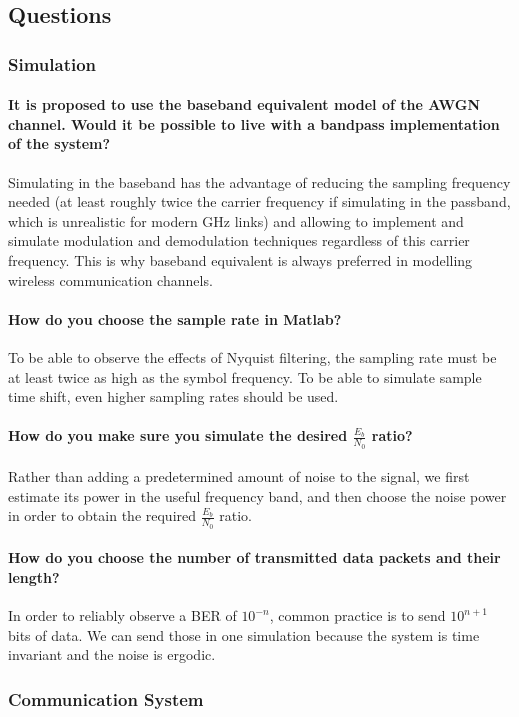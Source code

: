 \subsection{Questions}
\subsubsection{Simulation}
\paragraph{It is proposed to use the baseband equivalent model of the AWGN channel. Would it be
possible to live with a bandpass implementation of the system?}
Simulating in the baseband has the advantage of reducing the sampling frequency needed (at least roughly twice the carrier frequency if simulating in the passband, which is unrealistic for modern \si{\giga\hertz} links) and allowing to implement and simulate modulation and demodulation techniques regardless of this carrier frequency.
This is why baseband equivalent is always preferred in modelling wireless communication channels.
\paragraph{How do you choose the sample rate in Matlab?}
To be able to observe the effects of Nyquist filtering, the sampling rate must be at least twice as high as the symbol frequency. To be able to simulate sample time shift, even higher sampling rates should be used.
\paragraph{How do you make sure you simulate the desired $\frac{E_b}{N_0}$ ratio?}
Rather than adding a predetermined amount of noise to the signal, we first estimate its power in the useful frequency band, and then choose the noise power in order to obtain the required $\frac{E_b}{N_0}$ ratio.
\paragraph{How do you choose the number of transmitted data packets and their length?}
In order to reliably observe a BER of $10^{-n}$, common practice is to send $10^{n+1}$ bits of data. We can send those in one simulation because the system is time invariant and the noise is ergodic.
\subsubsection{Communication System}
